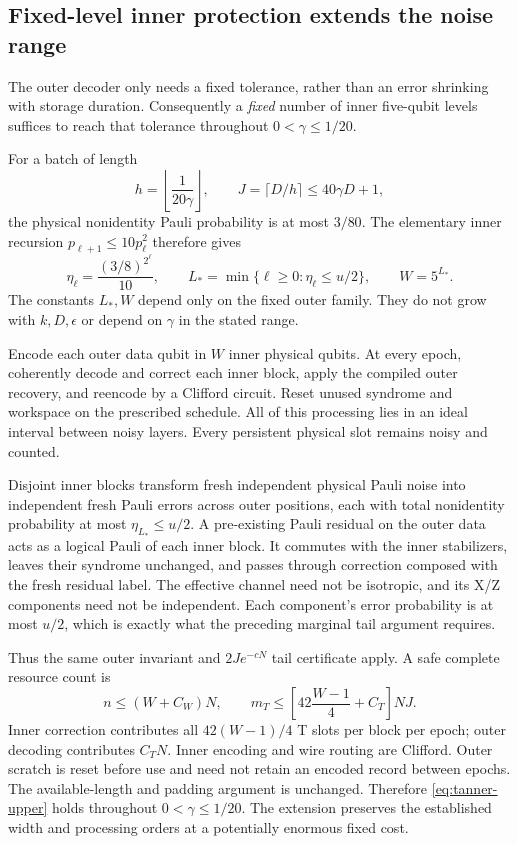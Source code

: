 \documentclass[11pt,a4paper]{article}
\numberwithin{equation}{section}
\theoremstyle{remark}\newtheorem*{remark}{Interpretation}
\newcommand{\eps}{\epsilon}
\begin{document}
\subsection{Fixed-level inner protection extends the noise range}
The outer decoder only needs a fixed tolerance, rather than an error shrinking with storage duration. Consequently a \emph{fixed} number of inner five-qubit levels suffices to reach that tolerance throughout $0<\gamma\le1/20$.

For a batch of length
\[
h=\left\lfloor\frac1{20\gamma}\right\rfloor,
\qquad J=\lceil D/h\rceil\le40\gamma D+1,
\]
the physical nonidentity Pauli probability is at most $3/80$. The elementary inner recursion $p_{\ell+1}\le10p_\ell^2$ therefore gives
\[
\eta_\ell=\frac{(3/8)^{2^\ell}}{10},\qquad
L_* =\min\{\ell\ge0:\eta_\ell\le u/2\},\qquad W=5^{L_*}.
\]
The constants $L_*,W$ depend only on the fixed outer family. They do not grow with $k,D,\eps$ or depend on $\gamma$ in the stated range.

Encode each outer data qubit in $W$ inner physical qubits. At every epoch, coherently decode and correct each inner block, apply the compiled outer recovery, and reencode by a Clifford circuit. Reset unused syndrome and workspace on the prescribed schedule. All of this processing lies in an ideal interval between noisy layers. Every persistent physical slot remains noisy and counted.

Disjoint inner blocks transform fresh independent physical Pauli noise into independent fresh Pauli errors across outer positions, each with total nonidentity probability at most $\eta_{L_*}\le u/2$. A pre-existing Pauli residual on the outer data acts as a logical Pauli of each inner block. It commutes with the inner stabilizers, leaves their syndrome unchanged, and passes through correction composed with the fresh residual label. The effective channel need not be isotropic, and its X/Z components need not be independent. Each component's error probability is at most $u/2$, which is exactly what the preceding marginal tail argument requires.

Thus the same outer invariant and $2Je^{-cN}$ tail certificate apply. A safe complete resource count is
\[
n\le(W+C_W)N,\qquad
m_T\le\left[42\frac{W-1}{4}+C_T\right]NJ.
\]
Inner correction contributes all $42(W-1)/4$ T slots per block per epoch; outer decoding contributes $C_TN$. Inner encoding and wire routing are Clifford. Outer scratch is reset before use and need not retain an encoded record between epochs. The available-length and padding argument is unchanged. Therefore \eqref{eq:tanner-upper} holds throughout $0<\gamma\le1/20$. The extension preserves the established width and processing orders at a potentially enormous fixed cost.
\end{document}
